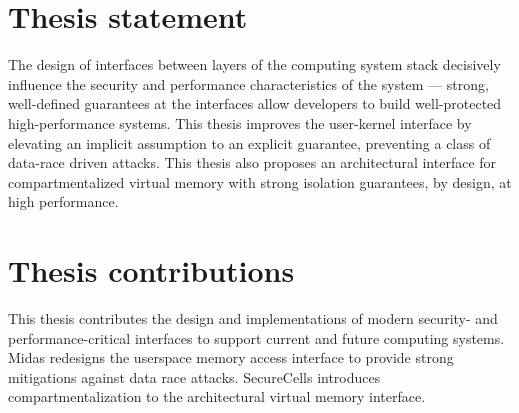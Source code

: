 




\section{Thesis statement}

The design of interfaces between layers of the computing system stack decisively influence the 
security and performance characteristics of the system --- 
strong, well-defined guarantees at the interfaces allow developers to build well-protected 
high-performance systems.
This thesis improves the user-kernel interface by elevating an implicit assumption to 
an explicit guarantee, preventing a class of data-race driven attacks.
This thesis also proposes an architectural interface for compartmentalized virtual memory
with strong isolation guarantees, by design, at high performance.

\section{Thesis contributions}

This thesis contributes the design and implementations of modern
security- and performance-critical interfaces to support 
current and future computing systems.
Midas redesigns the userspace memory access interface to provide
strong mitigations against data race attacks.
SecureCells introduces compartmentalization to the architectural
virtual memory interface.


